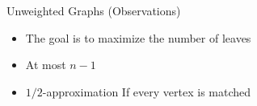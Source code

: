 \begin{frame}[<+->]{Unweighted Graphs (Observations)}
\begin{itemize}
  \item The goal is to maximize the number of leaves
  \item At most $n - 1$
  \item $1/2$-approximation If every vertex is matched 
\end{itemize}
\end{frame}